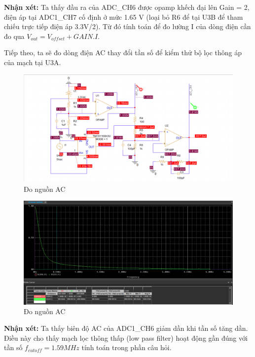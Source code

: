 \textbf{Nhận xét:} Ta thấy đầu ra của ADC\_CH6 được opamp khếch đại lên Gain = 2, điện áp tại ADC1\_CH7 cố định ở mức 1.65 V (loại bỏ R6 để tại U3B để tham chiếu trực tiếp điện áp 3.3V/2). Từ đó tính toán để đo lường I của dòng điện cần đo qua $V_{out} = V_{offset} + GAIN.I$.

Tiếp theo, ta sẽ đo dòng điện AC thay đổi tần số để kiểm thử bộ lọc thông áp của mạch tại U3A.

\begin{figure}[ht]
    \centering
    \includegraphics[width=1\textwidth]{graphics/section4/f23.png}
    \caption{Đo nguồn AC}
\end{figure}

\begin{figure}[ht]
    \centering
    \includegraphics[width=1\textwidth]{graphics/section4/f24.png}
    \caption{Đo nguồn AC}
\end{figure}

\textbf{Nhận xét:} Ta thấy biên độ AC của ADC1\_CH6 giảm dần khi tần số tăng dần. Điều này cho thấy mạch lọc thông thấp (low pass filter) hoạt động gần đúng với tần số $f_{cutoff} = 1.59 MHz$ tính toán trong phần câu hỏi.

\pagebreak

